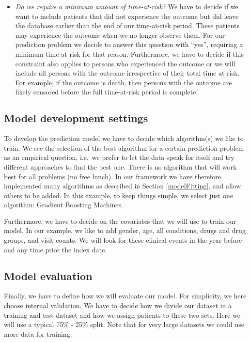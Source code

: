 \documentclass[11pt]{book}
\theoremstyle{definition}
\theoremstyle{definition}
\theoremstyle{definition}
\theoremstyle{remark}
\begin{document}
\begin{itemize}
\item
  \emph{Do we require a minimum amount of time-at-risk?} We have to decide if we want to include patients that did not experience the outcome but did leave the database earlier than the end of our time-at-risk period. These patients may experience the outcome when we no longer observe them. For our prediction problem we decide to answer this question with ``yes'', requiring a minimum time-at-risk for that reason. Furthermore, we have to decide if this constraint also applies to persons who experienced the outcome or we will include all persons with the outcome irrespective of their total time at risk. For example, if the outcome is death, then persons with the outcome are likely censored before the full time-at-risk period is complete.
\end{itemize}

\hypertarget{model-development-settings}{%
\subsection{Model development settings}\label{model-development-settings}}

To develop the prediction model we have to decide which algorithm(s) we like to train. We see the selection of the best algorithm for a certain prediction problem as an empirical question, i.e.~we prefer to let the data speak for itself and try different approaches to find the best one. There is no algorithm that will work best for all problems (no free lunch). In our framework we have therefore implemented many algorithms as described in Section \ref{modelFitting}, and allow others to be added. In this example, to keep things simple, we select just one algorithm: Gradient Boosting Machines. 

Furthermore, we have to decide on the covariates that we will use to train our model. In our example, we like to add gender, age, all conditions, drugs and drug groups, and visit counts. We will look for these clinical events in the year before and any time prior the index date.

\hypertarget{model-evaluation}{%
\subsection{Model evaluation}\label{model-evaluation}}

Finally, we have to define how we will evaluate our model. For simplicity, we here choose internal validation. We have to decide how we divide our dataset in a training and test dataset and how we assign patients to these two sets. Here we will use a typical 75\% - 25\% split. Note that for very large datasets we could use more data for training.
\end{document}
